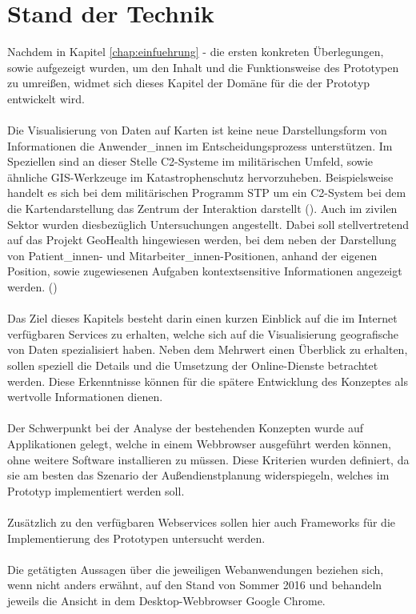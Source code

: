 \documentclass[../Bachelorarbeit.tex]{subfiles}
\begin{document}
\chapter{Stand der Technik}
\label{chap:analyse}

Nachdem in Kapitel \ref{chap:einfuehrung} -  die ersten konkreten Überlegungen, sowie  aufgezeigt wurden, um den Inhalt und die Funktionsweise des Prototypen zu umreißen, widmet sich dieses Kapitel der Domäne für die der Prototyp entwickelt wird.\\
\\
Die Visualisierung von Daten auf Karten ist keine neue Darstellungsform von Informationen die Anwender\_innen im Entscheidungsprozess unterstützen. 
Im Speziellen sind an dieser Stelle \ac{C2}-Systeme im militärischen Umfeld,  sowie ähnliche \ac{GIS}-Werkzeuge im Katastrophenschutz hervorzuheben.
Beispielsweise handelt es sich bei dem militärischen Programm \ac{STP} um ein \ac{C2}-System bei dem die Kartendarstellung das Zentrum der Interaktion darstellt (\cite[vgl.][]{SketchThruPlan}).
Auch im zivilen Sektor wurden diesbezüglich Untersuchungen angestellt. 
Dabei soll stellvertretend auf das Projekt GeoHealth hingewiesen werden, bei dem neben der Darstellung von Patient\_innen- und Mitarbeiter\_innen-Positionen, anhand der eigenen Position, sowie zugewiesenen Aufgaben kontextsensitive Informationen angezeigt werden. (\cite[vgl.][]{GeoHealth})\\
\\
Das Ziel dieses Kapitels besteht darin einen kurzen Einblick auf die im Internet verfügbaren Services zu erhalten, welche sich auf die Visualisierung geografische von Daten spezialisiert haben. 
Neben dem Mehrwert einen Überblick  zu erhalten, sollen speziell die Details und die Umsetzung der Online-Dienste betrachtet werden.
Diese Erkenntnisse können für die spätere Entwicklung  des Konzeptes als wertvolle Informationen dienen.\\
\\
Der Schwerpunkt bei der Analyse der bestehenden Konzepten wurde auf Applikationen gelegt, welche in einem Webbrowser ausgeführt werden können, ohne weitere Software installieren zu müssen.
Diese Kriterien wurden definiert, da sie am besten das Szenario der Außendienstplanung widerspiegeln, welches im Prototyp implementiert werden soll.\\
\\
Zusätzlich zu den verfügbaren Webservices sollen hier auch Frameworks für die Implementierung des Prototypen untersucht werden. \\
\\
Die getätigten Aussagen über die jeweiligen Webanwendungen beziehen sich, wenn nicht anders erwähnt, auf den Stand von Sommer 2016 und behandeln jeweils die Ansicht in dem Desktop-Webbrowser Google Chrome.
\end{document}
